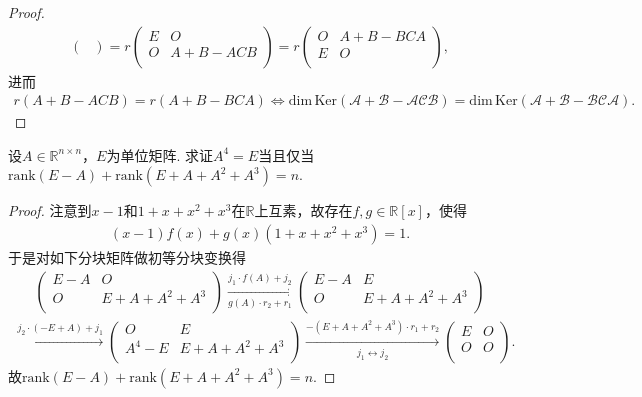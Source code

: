 \documentclass[../../main.tex]{subfiles}
\begin{document}
\begin{proof}
\begin{align*}
\begin{pmatrix}
\end{pmatrix} =r\begin{pmatrix}
E&		O\\
O&		A+B-ACB\\
\end{pmatrix} =r\begin{pmatrix}
O&		A+B-BCA\\
E&		O\\
\end{pmatrix},
\end{align*}
进而
\begin{align*}
r( A+B-ACB ) =r( A+B-BCA ) \Longleftrightarrow \mathrm{dim}\,\mathrm{Ker}( \mathscr{A} +\mathscr{B} -\mathscr{A} \mathscr{C} \mathscr{B} ) =\mathrm{dim}\,\mathrm{Ker}( \mathscr{A} +\mathscr{B} -\mathscr{B} \mathscr{C} \mathscr{A} ).
\end{align*}

\end{proof}

\begin{example}
设$A \in \mathbb{R}^{n \times n}$，$E$为单位矩阵. 求证$A^4 = E$当且仅当$\text{rank}(E - A) + \text{rank}\left(E + A + A^2 + A^3\right) = n$.
\end{example}
\begin{proof}
注意到$x-1$和$1+x+x^2+x^3$在$\mathbb{R}$上互素，故存在$f,g\in \mathbb{R}[x]$，使得
\begin{align*}
(x-1)f(x) + g(x)(1+x+x^2+x^3) = 1.
\end{align*}
于是对如下分块矩阵做初等分块变换得
\begin{align*}
\left( \begin{matrix}
E-A&		O\\
O&		E+A+A^2+A^3\\
\end{matrix} \right) \xrightarrow[g(A) \cdot r_2+r_1]{j_1 \cdot f(A) +j_2}\left( \begin{matrix}
E-A&		E\\
O&		E+A+A^2+A^3\\
\end{matrix} \right) 
\end{align*}
\begin{align*}
\xrightarrow{j_2 \cdot (-E+A) +j_1}\left( \begin{matrix}
O&		E\\
A^4-E&		E+A+A^2+A^3\\
\end{matrix} \right) \xrightarrow[j_1 \longleftrightarrow j_2]{-(E+A+A^2+A^3) \cdot r_1+r_2}\left( \begin{matrix}
E&		O\\
O&		O\\
\end{matrix} \right).
\end{align*}
故$\text{rank}(E-A) + \text{rank}(E+A+A^2+A^3) = n.$

\end{proof}
\end{document}
